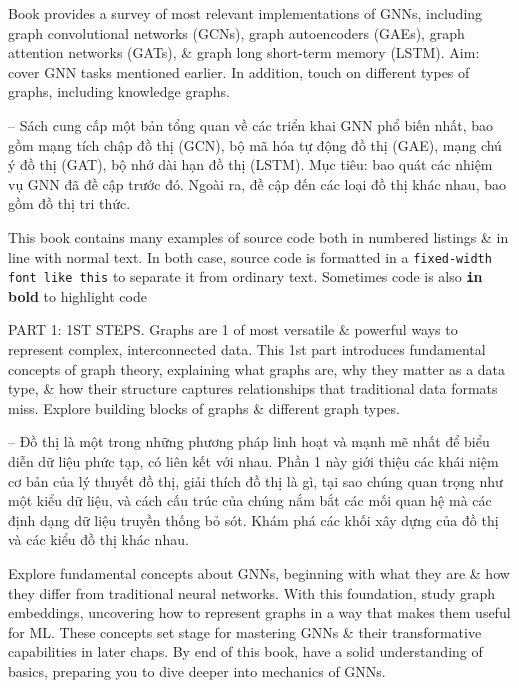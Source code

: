 \documentclass{article}
\begin{document}
\begin{itemize}
\begin{itemize}
        Book provides a survey of most relevant implementations of GNNs, including graph convolutional networks (GCNs), graph autoencoders (GAEs), graph attention networks (GATs), \& graph long short-term memory (LSTM). Aim: cover GNN tasks mentioned earlier. In addition, touch on different types of graphs, including knowledge graphs.

        -- Sách cung cấp một bản tổng quan về các triển khai GNN phổ biến nhất, bao gồm mạng tích chập đồ thị (GCN), bộ mã hóa tự động đồ thị (GAE), mạng chú ý đồ thị (GAT), bộ nhớ dài hạn đồ thị (LSTM). Mục tiêu: bao quát các nhiệm vụ GNN đã đề cập trước đó. Ngoài ra, đề cập đến các loại đồ thị khác nhau, bao gồm đồ thị tri thức.

        This book contains many examples of source code both in numbered listings \& in line with normal text. In both case, source code is formatted in a {\tt fixed-width font like this} to separate it from ordinary text. Sometimes code is also \textbf{\texttt in bold} to highlight code
    \end{itemize}
    PART 1: 1ST STEPS. Graphs are 1 of most versatile \& powerful ways to represent complex, interconnected data. This 1st part introduces fundamental concepts of graph theory, explaining what graphs are, why they matter as a data type, \& how their structure captures relationships that traditional data formats miss. Explore building blocks of graphs \& different graph types.

    -- Đồ thị là một trong những phương pháp linh hoạt và mạnh mẽ nhất để biểu diễn dữ liệu phức tạp, có liên kết với nhau. Phần 1 này giới thiệu các khái niệm cơ bản của lý thuyết đồ thị, giải thích đồ thị là gì, tại sao chúng quan trọng như một kiểu dữ liệu, và cách cấu trúc của chúng nắm bắt các mối quan hệ mà các định dạng dữ liệu truyền thống bỏ sót. Khám phá các khối xây dựng của đồ thị và các kiểu đồ thị khác nhau.

    Explore fundamental concepts about GNNs, beginning with what they are \& how they differ from traditional neural networks. With this foundation, study graph embeddings, uncovering how to represent graphs in a way that makes them useful for ML. These concepts set stage for mastering GNNs \& their transformative capabilities in later chaps. By end of this book, have a solid understanding of basics, preparing you to dive deeper into mechanics of GNNs.


\end{itemize}
\end{document}

